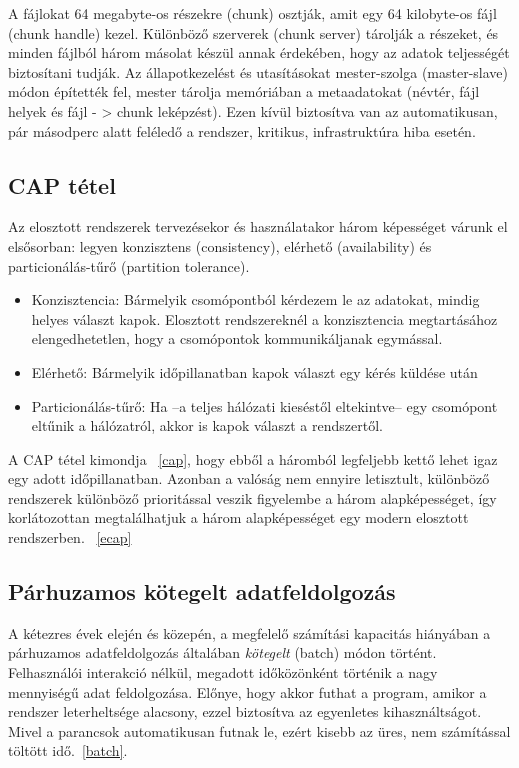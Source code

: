 \documentclass[a4paper,12pt]{article}
\begin{document}
A fájlokat 64 megabyte-os részekre (chunk) osztják, amit egy 64 kilobyte-os fájl (chunk handle) kezel. Különböző szerverek (chunk server) tárolják a részeket, és minden fájlból három másolat készül annak érdekében, hogy az adatok teljességét biztosítani tudják. Az állapotkezelést és utasításokat mester-szolga (master-slave) módon építették fel, mester tárolja memóriában a metaadatokat (névtér, fájl helyek és fájl - > chunk leképzést). Ezen kívül biztosítva van az automatikusan, pár másodperc alatt feléledő a rendszer, kritikus, infrastruktúra hiba esetén.

\subsection{CAP tétel}
Az elosztott rendszerek tervezésekor és használatakor három képességet várunk el elsősorban: legyen konzisztens (consistency), elérhető (availability) és particionálás-tűrő (partition tolerance). 
\begin{itemize}
\item Konzisztencia: Bármelyik csomópontból kérdezem le az adatokat, mindig helyes választ kapok. Elosztott rendszereknél a konzisztencia megtartásához elengedhetetlen, hogy a csomópontok kommunikáljanak egymással. 
\item Elérhető: Bármelyik időpillanatban kapok választ egy kérés küldése után
\item Particionálás-tűrő: Ha --a teljes hálózati kieséstől eltekintve-- egy csomópont eltűnik a hálózatról, akkor is kapok választ a rendszertől.
\end{itemize}
A CAP tétel kimondja ~\ref{cap}, hogy ebből a háromból legfeljebb kettő lehet igaz egy adott időpillanatban. Azonban a valóság nem ennyire letisztult, különböző rendszerek különböző prioritással veszik figyelembe a három alapképességet, így korlátozottan megtalálhatjuk a három alapképességet egy modern elosztott rendszerben. ~\ref{ecap}

\subsection{Párhuzamos kötegelt adatfeldolgozás}
A kétezres évek elején és közepén, a megfelelő számítási kapacitás hiányában a párhuzamos adatfeldolgozás általában \textsl{kötegelt} (batch) módon történt. Felhasználói interakció nélkül, megadott időközönként történik a nagy mennyiségű adat feldolgozása. Előnye, hogy akkor futhat a program, amikor a rendszer leterheltsége alacsony, ezzel biztosítva az egyenletes kihasználtságot. Mivel a parancsok automatikusan futnak le, ezért kisebb az üres, nem számítással töltött idő.~\ref{batch}.
\end{document}

